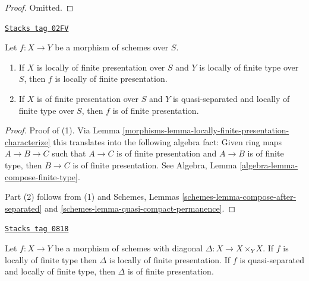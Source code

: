 \begin{proof}
Omitted.
\end{proof}

\begin{lemma}
\label{morphisms-lemma-finite-presentation-permanence}
\href{https://stacks.math.columbia.edu/tag/02FV}{\texttt{Stacks tag 02FV}}

Let $f : X \to Y$ be a morphism of schemes over $S$.
\begin{enumerate}
\item If $X$ is locally of finite presentation over $S$ and
$Y$ is locally of finite type over $S$, then $f$ is locally
of finite presentation.
\item If $X$ is of finite presentation over $S$ and $Y$ is quasi-separated
and locally of finite type over $S$, then $f$ is of finite presentation.
\end{enumerate}
\end{lemma}

\begin{proof}

Proof of (1). Via Lemma \ref{morphisms-lemma-locally-finite-presentation-characterize}
this translates into the following algebra
fact: Given ring maps $A \to B \to C$ such that $A \to C$ is
of finite presentation and $A \to B$ is of finite type,
then $B \to C$ is of finite presentation. See
Algebra, Lemma \ref{algebra-lemma-compose-finite-type}.

\medskip\noindent
Part (2) follows from (1) and
Schemes, Lemmas \ref{schemes-lemma-compose-after-separated} and
\ref{schemes-lemma-quasi-compact-permanence}.
\end{proof}

\begin{lemma}
\label{morphisms-lemma-diagonal-morphism-finite-type}
\href{https://stacks.math.columbia.edu/tag/0818}{\texttt{Stacks tag 0818}}

Let $f : X \to Y$ be a morphism of schemes with diagonal
$\Delta : X \to X \times_Y X$. If $f$ is locally of finite type
then $\Delta$ is locally of finite presentation. If $f$ is quasi-separated
and locally of finite type, then $\Delta$ is of finite presentation.
\end{lemma}

